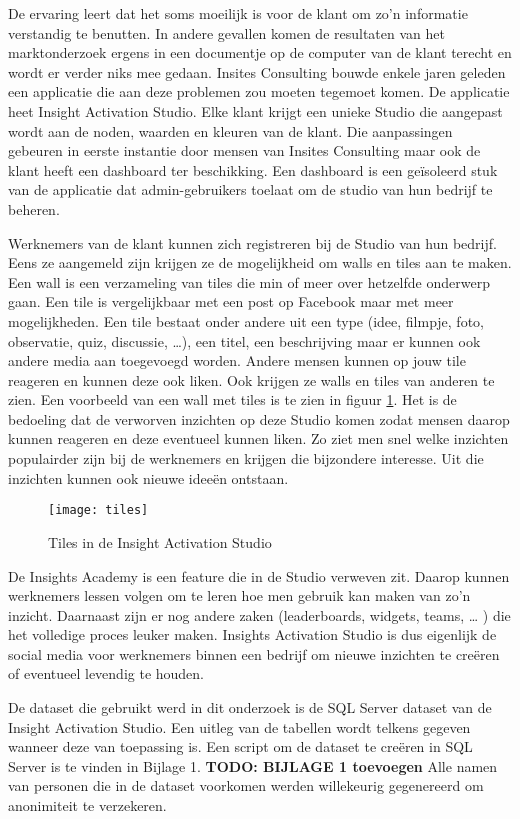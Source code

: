 De ervaring leert dat het soms moeilijk is voor de klant om zo'n informatie verstandig te benutten. In andere gevallen komen de resultaten van het marktonderzoek ergens in een documentje op de computer van de klant terecht en wordt er verder niks mee gedaan. Insites Consulting bouwde enkele jaren geleden een applicatie die aan deze problemen zou moeten tegemoet komen. De applicatie heet Insight Activation Studio. Elke klant krijgt een unieke Studio die aangepast wordt aan de noden, waarden en kleuren van de klant. Die aanpassingen gebeuren in eerste instantie door mensen van Insites Consulting maar ook de klant heeft een dashboard ter beschikking. Een dashboard is een geïsoleerd stuk van de applicatie dat admin-gebruikers toelaat om de studio van hun bedrijf te beheren.  

Werknemers van de klant kunnen zich registreren bij de Studio van hun bedrijf. Eens ze aangemeld zijn krijgen ze de mogelijkheid om walls en tiles aan te maken. Een wall is een verzameling van tiles die min of meer over hetzelfde onderwerp gaan. Een tile is vergelijkbaar met een post op Facebook maar met meer mogelijkheden. Een tile bestaat onder andere uit een type (idee, filmpje, foto, observatie, quiz, discussie, …), een titel, een beschrijving maar er kunnen ook andere media aan toegevoegd worden. Andere mensen kunnen op jouw tile reageren en kunnen deze ook liken. Ook krijgen ze walls en tiles van anderen te zien. Een voorbeeld van een wall met tiles is te zien in figuur \ref{fig:tiles}. Het is de bedoeling dat de verworven inzichten op deze Studio komen zodat mensen daarop kunnen reageren en deze eventueel kunnen liken. Zo ziet men snel welke inzichten populairder zijn bij de werknemers en krijgen die bijzondere interesse. Uit die inzichten kunnen ook nieuwe ideeën ontstaan.

\begin{figure}
	\centering
	\texttt{[image: tiles]}
	\caption{Tiles in de Insight Activation Studio}
	\label{fig:tiles}
\end{figure}

De Insights Academy is een feature die in de Studio verweven zit. Daarop kunnen werknemers lessen volgen om te leren hoe men gebruik kan maken van zo’n inzicht. Daarnaast zijn er nog andere zaken (leaderboards, widgets, teams, … ) die het volledige proces leuker maken. Insights Activation Studio is dus eigenlijk de social media voor werknemers binnen een bedrijf om nieuwe inzichten te creëren of eventueel levendig te houden.

De dataset die gebruikt werd in dit onderzoek is de SQL Server dataset van de Insight Activation Studio. Een uitleg van de tabellen wordt telkens gegeven wanneer deze van toepassing is. Een script om de dataset te creëren in SQL Server is te vinden in Bijlage 1. \textbf{TODO: BIJLAGE 1 toevoegen} Alle namen van personen die in de dataset voorkomen werden willekeurig gegenereerd om anonimiteit te verzekeren.

